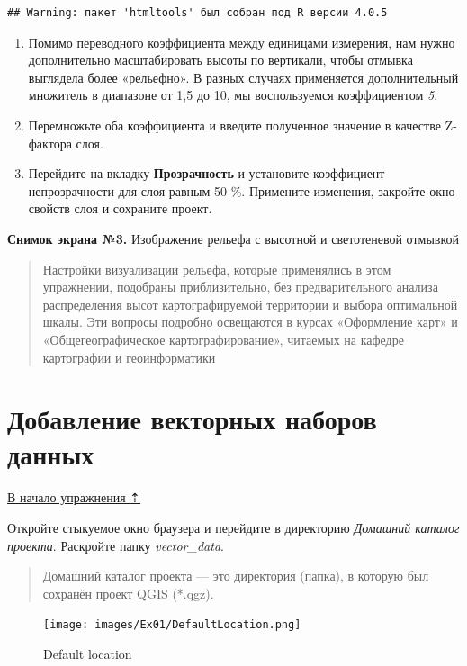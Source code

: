 \documentclass[
  12pt,
]{book}
\begin{document}
\begin{verbatim}
## Warning: пакет 'htmltools' был собран под R версии 4.0.5
\end{verbatim}

\begin{enumerate}
\def\labelenumi{\arabic{enumi}.}
\setcounter{enumi}{12}
\item
  Помимо переводного коэффициента между единицами измерения, нам нужно дополнительно масштабировать высоты по вертикали, чтобы отмывка выглядела более «рельефно». В разных случаях применяется дополнительный множитель в диапазоне от 1,5 до 10, мы воспользуемся коэффициентом \emph{5}.
\item
  Перемножьте оба коэффициента и введите полученное значение в качестве Z-фактора слоя.
\item
  Перейдите на вкладку \textbf{Прозрачность} и установите коэффициент непрозрачности для слоя равным 50 \%. Примените изменения, закройте окно свойств слоя и сохраните проект.
\end{enumerate}

\textbf{Снимок экрана №3.} Изображение рельефа с высотной и светотеневой отмывкой

\begin{quote}
Настройки визуализации рельефа, которые применялись в этом упражнении, подобраны приблизительно, без предварительного анализа распределения высот картографируемой территории и выбора оптимальной шкалы. Эти вопросы подробно освещаются в курсах «Оформление карт» и «Общегеографическое картографирование», читаемых на кафедре картографии и геоинформатики
\end{quote}

\hypertarget{map-design-general-vector}{%
\section{Добавление векторных наборов данных}\label{map-design-general-vector}}

\protect\hyperlink{map-design-general}{В начало упражнения ⇡}

Откройте стыкуемое окно браузера и перейдите в директорию \emph{Домашний каталог проекта}. Раскройте папку \emph{vector\_data}.

\begin{quote}
Домашний каталог проекта --- это директория (папка), в которую был сохранён проект QGIS (*.qgz).
\end{quote}

\begin{figure}
\centering
\texttt{[image: images/Ex01/DefaultLocation.png]}
\caption{Default location}
\end{figure}
\end{document}

